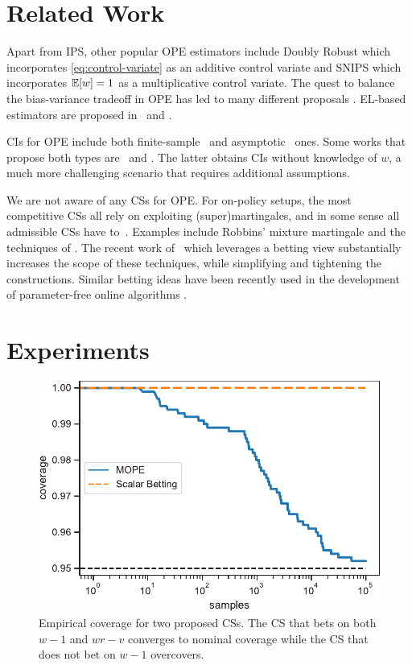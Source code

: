 \section{Related Work}
\label{sec:related}

Apart from IPS, other popular OPE estimators include Doubly Robust \cite{RnR,
dudik2011doubly} which incorporates \eqref{eq:control-variate} as an additive
control variate and SNIPS \cite{swaminathan2015self} which incorporates
$\mathbb{E}[w]=1$ as a multiplicative control variate.  The quest to balance the
bias-variance tradeoff in OPE has led to many different 
proposals \cite{SWITCH,vlassis2019design}.
EL-based estimators are proposed in~\citet{kallus2019intrinsically} and
\citet{karampatziakis2019empirical}.

CIs for OPE include both finite-sample~\cite{thomas2015high} and
asymptotic~\cite{li2015counterfactual,karampatziakis2019empirical} ones. Some
works that propose both types are~\citet{bottou2013counterfactual} and
\citet{dai2020coindice}. The latter obtains CIs without knowledge of $w$, a much
more challenging scenario that requires additional assumptions.

We are not aware of any CSs for OPE.  For on-policy setups, the most
competitive CSs all rely on exploiting (super)martingales, and in some sense
all admissible CSs have to~\cite{ramdas2020admissible}.  Examples include Robbins' mixture
martingale \cite{robbins_statistical_1970} and the techniques of
\citet{howard_uniform_2019}. The recent work
of~\citet{waudby-smith_variance-adaptive_2020} which 
leverages a betting view substantially
increases the scope of these techniques, while
simplifying and tightening the constructions. Similar betting 
ideas have been recently used in the development of 
parameter-free online algorithms \cite{OrabonaP16}.

\section{Experiments}

\begin{figure}[h!]
    \centering
    \includegraphics[width=0.75\linewidth]{coverage}
    \caption{Empirical coverage for two proposed CSs. The CS that bets on 
    both $w-1$ and $wr-v$ converges to nominal coverage while the CS
    that does not bet on $w-1$ overcovers.}
    \label{fig:coverage}
\end{figure}

